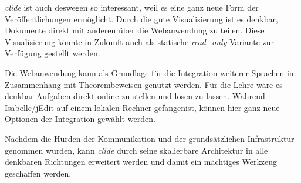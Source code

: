 \textit{clide} ist auch deswegen so interessant, weil es eine ganz neue Form der Veröffentlichungen
ermöglicht. Durch die gute Visualisierung ist es denkbar, Dokumente direkt mit anderen über die
Webanwendung zu teilen. Diese Visualisierung könnte in Zukunft auch als statische \textit{read-
only}-Variante zur Verfügung gestellt werden. 

Die Webanwendung kann als Grundlage für die Integration weiterer Sprachen im Zusammenhang mit
Theorembeweisen genutzt werden. Für die Lehre wäre es denkbar Aufgaben direkt online zu stellen
und lösen zu lassen. Während Isabelle/jEdit auf einem lokalen Rechner \glqq gefangen\grqq ist,
können hier ganz neue Optionen der Integration gewählt werden.

Nachdem die Hürden der Kommunikation und der grundsätzlichen Infrastruktur genommen wurden, kann
\textit{clide} durch seine skalierbare Architektur in alle denkbaren Richtungen erweitert werden und
damit ein mächtiges Werkzeug geschaffen werden.